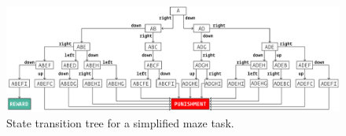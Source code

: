 \begin{figure}[hb!]
\caption{State transition tree for a simplified maze task.}
\label{fig:fsmtree}
\includegraphics[]{figures/maze.pdf}
\end{figure}


\clearpage
